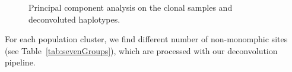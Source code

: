 \documentclass{article}
\begin{document}
\begin{figure}[h]
\centering
{}
\caption{Principal component analysis on the clonal samples and deconvoluted haplotypes.}\label{fig:pca}
\end{figure}


For each population cluster, we find different number of non-monomphic sites (see Table~\ref{tab:sevenGroups}), which are processed with our deconvolution pipeline.
\end{document}
